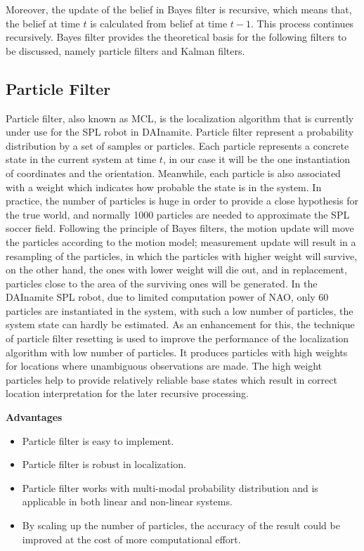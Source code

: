 Moreover, the update of the belief in Bayes filter is recursive, which means that, the belief at time $t$ is calculated from belief at time $t-1$. This process continues recursively. Bayes filter provides the theoretical basis for the following filters to be discussed, namely particle filters and Kalman filters. 

\subsection{Particle Filter}
Particle filter, also known as \gls{MCL}, is the localization algorithm that is currently under use for the \gls{SPL} robot in DAInamite. Particle filter represent a probability distribution by a set of samples or particles. Each particle represents a concrete state in the current system at time $t$, in our case it will be the one instantiation of coordinates and the orientation. Meanwhile, each particle is also associated with a weight which indicates how probable the state is in the system. In practice, the number of particles is huge in order to provide a close hypothesis for the true world, and normally 1000 particles are needed to approximate the \gls{SPL} soccer field. Following the principle of Bayes filters, the motion update will move the particles according to the motion model; measurement update will result in a resampling of the particles, in which the particles with higher weight will survive, on the other hand, the ones with lower weight will die out, and in replacement, particles close to the area of the surviving ones will be generated. In the DAInamite \gls{SPL} robot, due to limited computation power of NAO, only 60 particles are instantiated in the system, with such a low number of particles, the system state can hardly be estimated. As an enhancement for this, the technique of particle filter resetting is used to improve the performance of the localization algorithm with low number of particles. It produces particles with high weights for locations where unambiguous observations are made. The high weight particles help to provide relatively reliable base states which result in correct location interpretation for the later recursive processing. 

\noindent\textbf{Advantages}
\begin{itemize}
  \item  Particle filter is easy to implement.
  \item Particle filter is robust in localization. 
  \item  Particle filter works with multi-modal probability distribution and is applicable in both linear and non-linear systems.
  \item  By scaling up the number of particles, the accuracy of the result could be improved at the cost of more computational effort.
\end{itemize}

